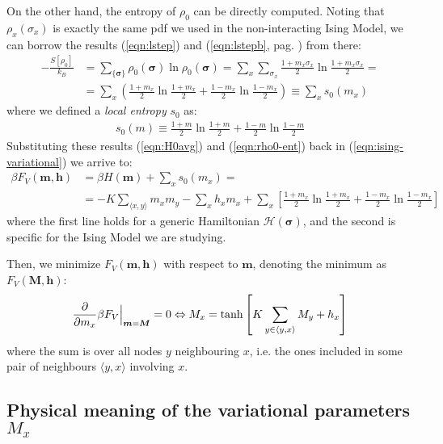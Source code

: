 \documentclass[../template.tex]{subfiles}
\begin{document}
On the other hand, the entropy of $\rho_0$ can be directly computed. Noting that $\rho_x(\sigma_x)$ is exactly the same pdf we used in the non-interacting Ising Model, we can borrow the results (\ref{eqn:lstep}) and (\ref{eqn:lstepb}, pag. \pageref{eqn:lstep}) from there:
\begin{align}\nonumber
    -\frac{S[\rho_0]}{k_B} &= \sum_{\{\bm{\sigma}\}} \rho_0(\bm{\sigma}) \ln \rho_0(\bm{\sigma}) = \sum_x \sum_{\sigma_x} \frac{1+m_x \sigma_x}{2} \ln \frac{1+m_x \sigma_x}{2} =\\ \label{eqn:rho0-ent}
    &= \sum_x \left(\frac{1+m_x}{2} \ln \frac{1+m_x}{2} + \frac{1-m_x}{2} \ln \frac{1-m_x}{2} \right)  \equiv \sum_x s_0(m_x)
\end{align}
where we defined a \textit{local entropy} $s_0$ as: 
\begin{align*}
    s_0(m) \equiv \frac{1+m}{2} \ln \frac{1+m}{2} + \frac{1-m}{2} \ln \frac{1-m}{2}    
\end{align*}
Substituting these results (\ref{eqn:H0avg}) and (\ref{eqn:rho0-ent}) back in (\ref{eqn:ising-variational}) we arrive to:
\begin{align*}
    \beta F_V(\bm{m}, \bm{h}) &= \beta H(\bm{m}) + \sum_x s_0(m_x) =\\
    &= -K \sum_{\langle x,y \rangle} m_x m_y - \sum_x h_x m_x + \sum_x \left[\frac{1+m_x}{2} \ln \frac{1+m_x}{2} + \frac{1-m_x}{2} \ln \frac{1-m_x}{2}    \right]
\end{align*}
where the first line holds for a generic Hamiltonian $\mathcal{H}(\bm{\sigma})$, and the second is specific for the Ising Model we are studying.

\medskip

Then, we minimize $F_V(\bm{m}, \bm{h})$ with respect to $\bm{m}$, denoting the minimum as $F_V(\bm{M}, \bm{h})$:
\begin{align*}
    \pdv{m_x} \beta F_V \Big|_{\bm{m} = \bm{M}} = 0 \Leftrightarrow M_x = \tanh \left[K \sum_{y \in \langle y, x\rangle} M_y + h_x\right]
\end{align*} %
where the sum is over all nodes $y$ neighbouring $x$, i.e. the ones included in some pair of neighbours $\langle y,x \rangle$ involving $x$.

\subsection{Physical meaning of the variational parameters $M_x$}
\end{document}
